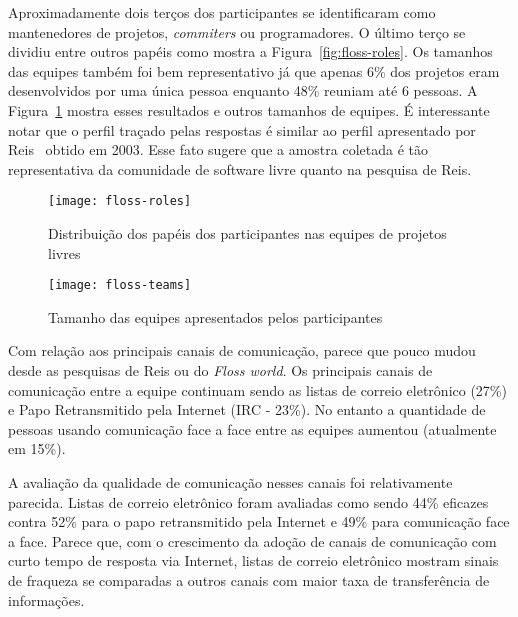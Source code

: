 Aproximadamente dois terços dos participantes se identificaram como
mantenedores de projetos, \textit{commiters} ou programadores. O
último terço se dividiu entre outros papéis como mostra a
Figura~\ref{fig:floss-roles}. Os tamanhos das equipes também foi bem
representativo já que apenas 6\% dos projetos eram desenvolvidos por
uma única pessoa enquanto 48\% reuniam até 6 pessoas. A
Figura~\ref{fig:floss-teams} mostra esses resultados e outros tamanhos
de equipes. É interessante notar que o perfil traçado pelas respostas
é similar ao perfil apresentado por Reis~\cite{Reis2003} obtido em
2003. Esse fato sugere que a amostra coletada é tão representativa da
comunidade de software livre quanto na pesquisa de Reis.



\begin{figure}[htb]
  \begin{minipage}[t]{0.55\linewidth}
    \centering
    \texttt{[image: floss-roles]}
    \caption{Distribuição dos papéis dos participantes nas equipes de
      projetos livres}
    \label{fig:floss-roles}
  \end{minipage}
  \begin{minipage}[t]{0.45\linewidth}
    \centering
    \texttt{[image: floss-teams]}
    \caption{Tamanho das equipes apresentados pelos participantes}
    \label{fig:floss-teams}
  \end{minipage}
\end{figure}

Com relação aos principais canais de comunicação, parece que pouco
mudou desde as pesquisas de Reis ou do \textit{Floss world}. Os
principais canais de comunicação entre a equipe continuam sendo as
listas de correio eletrônico (27\%) e Papo Retransmitido pela Internet
(IRC - 23\%). No entanto a quantidade de pessoas usando comunicação
face a face entre as equipes aumentou (atualmente em 15\%).

A avaliação da qualidade de comunicação nesses canais foi
relativamente parecida. Listas de correio eletrônico foram avaliadas
como sendo 44\% eficazes contra 52\% para o papo retransmitido pela
Internet e 49\% para comunicação face a face. Parece que, com o
crescimento da adoção de canais de comunicação com curto tempo de
resposta via Internet, listas de correio eletrônico mostram sinais de
fraqueza se comparadas a outros canais com maior taxa de transferência
de informações.

